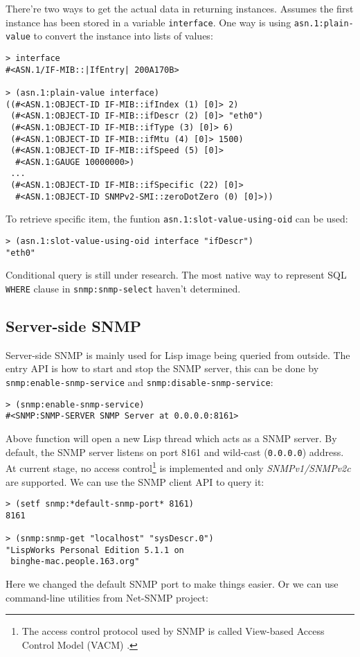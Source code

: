 \documentclass[reprint,9pt]{sigplanconf}
\begin{document}
There're two ways to get the actual data in returning instances. Assumes
the first instance has been stored in a variable \texttt{interface}. One
way is using \texttt{asn.1:plain-value} to convert the instance into lists
of values:
\begin{verbatim}
> interface
#<ASN.1/IF-MIB::|IfEntry| 200A170B>

> (asn.1:plain-value interface)
((#<ASN.1:OBJECT-ID IF-MIB::ifIndex (1) [0]> 2)
 (#<ASN.1:OBJECT-ID IF-MIB::ifDescr (2) [0]> "eth0")
 (#<ASN.1:OBJECT-ID IF-MIB::ifType (3) [0]> 6)
 (#<ASN.1:OBJECT-ID IF-MIB::ifMtu (4) [0]> 1500)
 (#<ASN.1:OBJECT-ID IF-MIB::ifSpeed (5) [0]>
  #<ASN.1:GAUGE 10000000>)
 ...
 (#<ASN.1:OBJECT-ID IF-MIB::ifSpecific (22) [0]>
  #<ASN.1:OBJECT-ID SNMPv2-SMI::zeroDotZero (0) [0]>))
\end{verbatim}
To retrieve specific item, the funtion \texttt{asn.1:slot-value-using-oid}
can be used:
\begin{verbatim}
> (asn.1:slot-value-using-oid interface "ifDescr")
"eth0"
\end{verbatim}

Conditional query is still under research. The most native way to
represent SQL \texttt{WHERE} clause in \texttt{snmp:snmp-select}
haven't determined.

\subsection{Server-side SNMP}

Server-side SNMP is mainly used for Lisp image being queried from
outside. The entry API is how to start and stop the SNMP server, this
can be done by \texttt{snmp:enable-snmp-service} and
\texttt{snmp:disable-snmp-service}:
\begin{verbatim}
> (snmp:enable-snmp-service)
#<SNMP:SNMP-SERVER SNMP Server at 0.0.0.0:8161>
\end{verbatim}
Above function will open a new Lisp thread which acts as a SNMP
server. By default, the SNMP server listens on port 8161 and
wild-cast (\texttt{0.0.0.0}) address. At current stage, no access
control\footnote{The access control protocol used by SNMP is called View-based Access Control Model (VACM) \cite{RFC:3415}.}
is implemented and only \textsl{SNMPv1/SNMPv2c} are
supported. We can use the SNMP client API to query it:
\begin{verbatim}
> (setf snmp:*default-snmp-port* 8161)
8161

> (snmp:snmp-get "localhost" "sysDescr.0")
"LispWorks Personal Edition 5.1.1 on
 binghe-mac.people.163.org"
\end{verbatim}
Here we changed the default SNMP port to make things easier. Or we can
use command-line utilities from Net-SNMP project:
\end{document}
